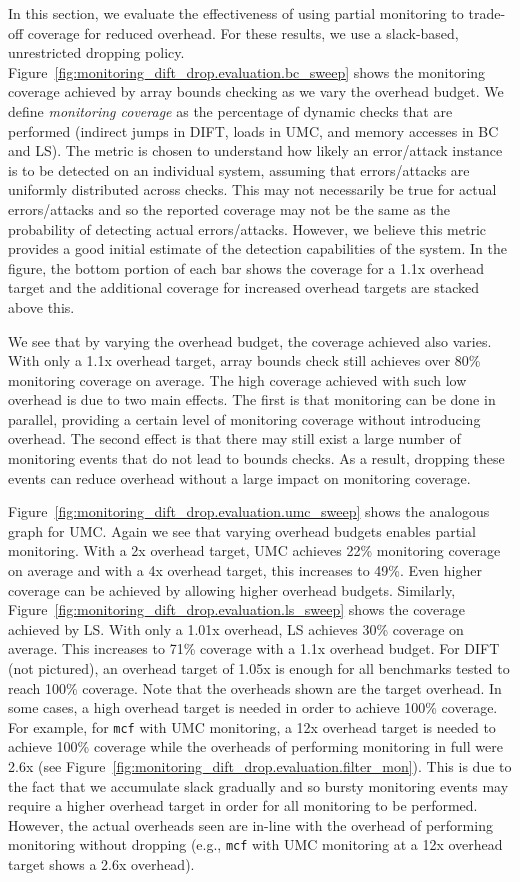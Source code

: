 In this section, we evaluate the effectiveness of using partial monitoring to
trade-off coverage for reduced overhead.  For these results, we use a
slack-based, unrestricted dropping policy.
Figure~\ref{fig:monitoring_dift_drop.evaluation.bc_sweep} shows the monitoring
coverage achieved by array bounds checking as we vary the overhead budget.  We
define \emph{monitoring coverage} as the percentage of dynamic checks that are
performed (indirect jumps in DIFT, loads in UMC, and memory accesses in BC and
LS).  The metric is chosen to understand how likely an error/attack instance is
to be detected on an individual system, assuming that errors/attacks are
uniformly distributed across checks. This may not necessarily be true for
actual errors/attacks and so the reported coverage may not be the same as the
probability of detecting actual errors/attacks.  However, we believe this
metric provides a good initial estimate of the detection capabilities of the
system.  In the figure, the bottom portion of each bar shows the coverage for a
1.1x overhead target and the additional coverage for increased overhead targets
are stacked above this.

We see that by varying the overhead budget, the coverage achieved also varies.
With only a 1.1x overhead target, array bounds check still achieves over 80\%
monitoring coverage on average. The high coverage achieved with such low
overhead is due to two main effects.  The first is that monitoring can be done
in parallel, providing a certain level of monitoring coverage without
introducing overhead. The second effect is that there may still exist a large
number of monitoring events that do not lead to bounds checks. As a result,
dropping these events can reduce overhead without a large impact on monitoring
coverage.

Figure~\ref{fig:monitoring_dift_drop.evaluation.umc_sweep} shows the analogous
graph for UMC. Again we see that varying overhead budgets enables partial
monitoring.  With a 2x overhead target, UMC achieves 22\% monitoring coverage
on average and with a 4x overhead target, this increases to 49\%.  Even higher
coverage can be achieved by allowing higher overhead budgets.  Similarly,
Figure~\ref{fig:monitoring_dift_drop.evaluation.ls_sweep} shows the coverage
achieved by LS.  With only a 1.01x overhead, LS achieves 30\% coverage on
average. This increases to 71\% coverage with a 1.1x overhead budget.  For DIFT
(not pictured), an overhead target of 1.05x is enough for all benchmarks tested
to reach 100\% coverage.  Note that the overheads shown are the target
overhead. In some cases, a high overhead target is needed in order to achieve
100\% coverage. For example, for {\tt mcf} with UMC monitoring, a 12x overhead
target is needed to achieve 100\% coverage while the overheads of performing
monitoring in full were 2.6x (see
Figure~\ref{fig:monitoring_dift_drop.evaluation.filter_mon}). This is due to
the fact that we accumulate slack gradually and so bursty monitoring events may
require a higher overhead target in order for all monitoring to be performed.
However, the actual overheads seen are in-line with the overhead of performing
monitoring without dropping (e.g., {\tt mcf} with UMC monitoring at a 12x
overhead target shows a 2.6x overhead).

